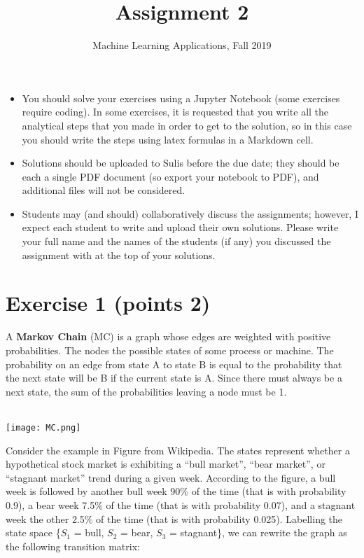 \documentclass[a4paper,10pt]{article}
\title{Assignment 2}
\author{Machine Learning Applications, Fall 2019}
\date{}
\begin{document}
\maketitle

\begin{itemize}
 \item You should solve your exercises using a Jupyter Notebook (some exercises require coding).  In some exercises, it is requested that you write all the analytical steps that you made in order to get to the solution, so in this case you should write the steps using latex formulas in a Markdown cell.
 \item Solutions should be uploaded to Sulis before the due date; they should be each a single PDF document (so export your notebook to PDF), and additional files will not be considered.
\item  Students may (and should) collaboratively discuss the  assignments; however, I expect each student to write and upload their own solutions. Please write your full name and the names of the students (if any) you discussed the  assignment with at the top of your solutions.
\end{itemize}

\newpage 
\section*{Exercise 1 (points 2)}
 A \textbf{Markov Chain} (MC) is a graph whose edges are weighted with positive probabilities. The nodes the possible states of some process or machine. The probability on an edge from state A to state B is equal to the probability that the next state will be B if the current state is A. Since there must always be a next state, the sum of the probabilities leaving a node must be 1. \\~\\
 \begin{center}
  \texttt{[image: MC.png]}
 \end{center}
 Consider the example in Figure from Wikipedia. 
 The states represent whether a hypothetical stock market is exhibiting a ``bull market'', ``bear market'', or ``stagnant market'' trend during a given week. According to the figure, a bull week is followed by another bull week 90\% of the time (that is with probability
 0.9), a bear week 7.5\% of the time (that is with probability
 0.07), and a stagnant week the other 2.5\%  of the time (that is with probability
 0.025). Labelling the state space \{$S_1$ = bull, $S_2$ = bear, $S_3$ = stagnant\}, we can rewrite the graph as the following transition matrix:
\end{document}
